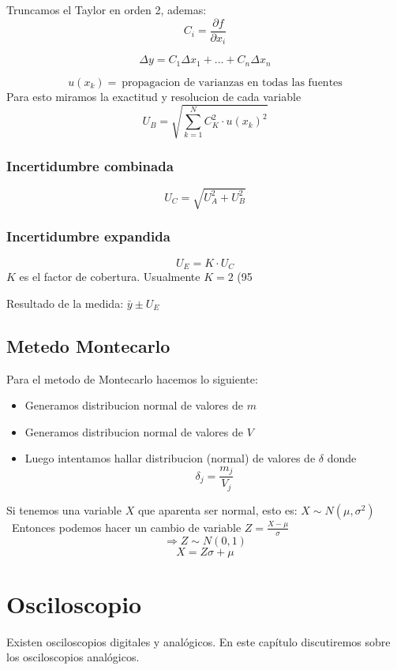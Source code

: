 \documentclass{report}
\begin{document}
Truncamos el Taylor en orden 2, ademas:
$$C_i = \frac{\partial{f}}{\partial{x_i}}$$

$$\Delta y =C_1\Delta x_1 + ... + C_n \Delta x_n$$

$$u(x_k) = ~\text{propagacion de varianzas en todas las fuentes}$$
Para esto miramos la exactitud y resolucion de cada variable
$$\boxed{U_{B} = \sqrt{\sum_{k=1}^{N}{C_K^2}\cdot {u(x_k)}^2}}$$


\subsection{Incertidumbre combinada}

$$U_C = \sqrt{U_A^2 + U_B^2}$$

\subsection{Incertidumbre expandida}

$$U_E = K \cdot U_C$$
$K$ es el factor de cobertura.
Usualmente $K = 2$ (95%

Resultado de la medida: $\bar{y} \pm U_E$

\section{Metedo Montecarlo}

Para el metodo de Montecarlo hacemos lo siguiente:
\begin{itemize}
	\item Generamos distribucion normal de valores de $m$
	\item Generamos distribucion normal de valores de $V$
	\item Luego intentamos hallar distribucion (normal) de valores de $\delta$ donde $$\delta_j = \frac{m_j}{V_j}$$
\end{itemize}

Si tenemos una variable $X$ que aparenta ser normal, esto es: $X\sim N(\mu ,\sigma^2)$ \
Entonces podemos hacer un cambio de variable $Z=\frac{X-\mu}{\sigma}$ \
$$\Rightarrow Z \sim N(0,1)$$
$$X = Z\sigma + \mu$$



\chapter{Osciloscopio}
Existen osciloscopios digitales y analógicos. En este capítulo discutiremos sobre los osciloscopios analógicos.
\end{document}

